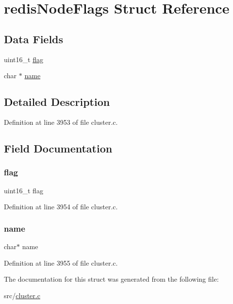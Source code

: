 \hypertarget{structredis_node_flags}{}\section{redis\+Node\+Flags Struct Reference}
\label{structredis_node_flags}
\subsection*{Data Fields}
\begin{DoxyCompactItemize}
\item 
uint16\+\_\+t \hyperlink{structredis_node_flags_adbcb4f0111725357699179f5d05cccd2}{flag}
\item 
char $\ast$ \hyperlink{structredis_node_flags_a5ac083a645d964373f022d03df4849c8}{name}
\end{DoxyCompactItemize}


\subsection{Detailed Description}


Definition at line 3953 of file cluster.\+c.



\subsection{Field Documentation}
\mbox{\label{structredis_node_flags_adbcb4f0111725357699179f5d05cccd2}} 
\subsubsection{\texorpdfstring{flag}{flag}}
{\footnotesize\ttfamily uint16\+\_\+t flag}



Definition at line 3954 of file cluster.\+c.

\mbox{\label{structredis_node_flags_a5ac083a645d964373f022d03df4849c8}} 
\subsubsection{\texorpdfstring{name}{name}}
{\footnotesize\ttfamily char$\ast$ name}



Definition at line 3955 of file cluster.\+c.



The documentation for this struct was generated from the following file\+:\begin{DoxyCompactItemize}
\item 
src/\hyperlink{cluster_8c}{cluster.\+c}\end{DoxyCompactItemize}
